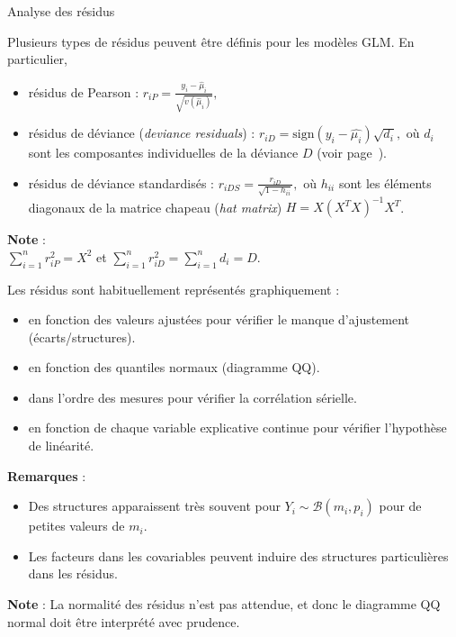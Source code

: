 \documentclass{BeamerTemplate}
\begin{document}
\begin{refsection}
\begin{frame}{Analyse des résidus}

Plusieurs types de résidus peuvent être définis pour les modèles GLM. En particulier, 
\begin{itemize}
\item {\color{blue}résidus de Pearson} : $r_{iP} = \frac{y_i - \hat{\mu}_i}{\sqrt{v(\hat{\mu}_i)}},$
\item {\color{blue}résidus de déviance} (\textit{deviance residuals}) : $r_{iD} = \mbox{sign}(y_i - \hat{\mu_i}) \sqrt{d_i},$
où $d_i$ sont les composantes individuelles de la déviance $D$ (voir page~\pageref{deviance.comp}).
\item {\color{blue}résidus de déviance standardisés} : $r_{iDS} = \frac{r_{iD}}{\sqrt{1-h_{ii}}},$
où $h_{ii}$ sont les éléments diagonaux de la matrice chapeau (\textit{hat matrix}) $H=X(X^T
X)^{-1}X^T$.
\end{itemize}

\bigskip
\textbf{Note} : \\
$\sum_{i=1}^n r_{iP}^2 = X^2$ et $\sum_{i=1}^n r_{iD}^2 =
\sum_{i=1}^n d_i = D$.

\end{frame}

\begin{frame}{}
Les résidus sont habituellement représentés graphiquement :
\begin{itemize}
\item en fonction des valeurs ajustées pour vérifier le manque d'ajustement (écarts/structures).
\item en fonction des quantiles normaux (diagramme QQ). 
\item dans l'ordre des mesures pour vérifier la corrélation sérielle.
\item en fonction de chaque variable explicative continue pour vérifier l'hypothèse de linéarité.
\end{itemize}

\bigskip
\textbf{Remarques} : 
\begin{itemize}
\item Des structures apparaissent très souvent pour $Y_i \sim {\mathcal B}(m_i,p_i)$ pour de petites valeurs de $m_i$.
\item Les facteurs dans les covariables peuvent induire des structures particulières dans les résidus.
\end{itemize}

\bigskip
\textbf{Note} : 
La normalité des résidus n'est pas attendue, et donc le
diagramme QQ normal doit être interprété avec prudence.
\end{frame}


\end{refsection}
\end{document}
